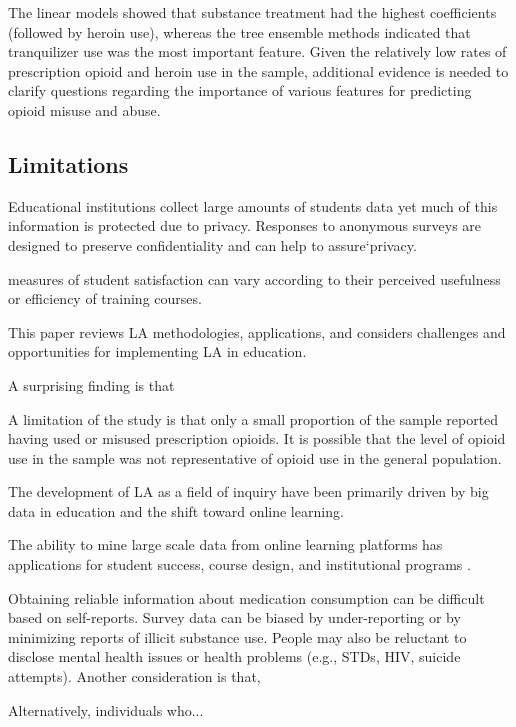 \documentclass[sigconf]{acmart}
\begin{document}
The linear models showed that substance treatment had the highest
coefficients (followed by heroin use), whereas the tree ensemble methods
indicated that tranquilizer use was the most important feature. Given the 
relatively low rates of prescription opioid and heroin use in the sample, 
additional evidence is needed to clarify questions regarding the importance
of various features for predicting opioid misuse and abuse. 
 


\subsection{Limitations}

Educational institutions collect large amounts of students data yet much of
this information is protected due to privacy. Responses to anonymous surveys 
are designed to preserve confidentiality and can help to assure`privacy. 


measures of student satisfaction can vary according 
to their perceived usefulness or efficiency of training courses.

This paper reviews LA methodologies, applications, and considers challenges 
and opportunities for implementing LA in education.

A surprising finding is that 

A limitation of the study is that only a small proportion of the sample 
reported having used or misused prescription opioids. It is possible that the 
level of opioid use in the sample was not representative of opioid use in the 
general population. 

The development of LA as a field of 
inquiry have been primarily driven by big data in education and the shift 
toward online learning. 

 The ability to mine large scale data from online 
learning platforms has applications for student success, course design, and 
institutional programs \cite{Lester19}. 

Obtaining reliable information about medication consumption can be difficult 
based on self-reports. Survey data can be biased by under-reporting or by 
minimizing reports of illicit substance use. People may also be reluctant to 
disclose mental health issues or health problems (e.g., STDs, HIV, suicide 
attempts). Another consideration is that,


Alternatively, individuals who...
\end{document}
